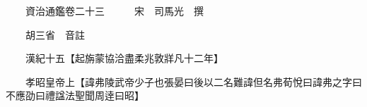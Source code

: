 










 


 
 


 

  
  
  
  
  





  
  
  
  
  
 
  

  

  
  
  



  

 
 

  
   




  

  
  


  　　資治通鑑卷二十三　　　宋　司馬光　撰

　　胡三省　音註

　　漢紀十五【起旃蒙協洽盡柔兆敦牂凡十二年】

　　孝昭皇帝上【諱弗陵武帝少子也張晏曰後以二名難諱但名弗荀悅曰諱弗之字曰不應劭曰禮諡法聖聞周逹曰昭】

